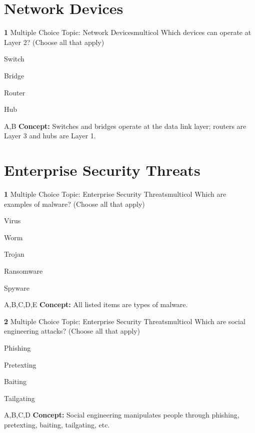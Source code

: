 \documentclass[10pt,a4paper]{article}
\begin{document}
\section{Network Devices}
\begin{qcard}{\color{white}\textbf{1} \hfill \small Multiple Choice \textbar{} Topic: Network Devices}{multicol}
Which devices can operate at Layer 2? (Choose all that apply)

\begin{qoptions}
\item Switch
\item Bridge
\item Router
\item Hub
\end{qoptions}
\begin{explainbox}{A,B}
\textbf{Concept:} Switches and bridges operate at the data link layer; routers are Layer 3 and hubs are Layer 1.
\end{explainbox}
\end{qcard}

\section{Enterprise Security Threats}
\begin{qcard}{\color{white}\textbf{1} \hfill \small Multiple Choice \textbar{} Topic: Enterprise Security Threats}{multicol}
Which are examples of malware? (Choose all that apply)

\begin{qoptions}
\item Virus
\item Worm
\item Trojan
\item Ransomware
\item Spyware
\end{qoptions}
\begin{explainbox}{A,B,C,D,E}
\textbf{Concept:} All listed items are types of malware.
\end{explainbox}
\end{qcard}

\begin{qcard}{\color{white}\textbf{2} \hfill \small Multiple Choice \textbar{} Topic: Enterprise Security Threats}{multicol}
Which are social engineering attacks? (Choose all that apply)

\begin{qoptions}
\item Phishing
\item Pretexting
\item Baiting
\item Tailgating
\end{qoptions}
\begin{explainbox}{A,B,C,D}
\textbf{Concept:} Social engineering manipulates people through phishing, pretexting, baiting, tailgating, etc.
\end{explainbox}
\end{qcard}
\end{document}
